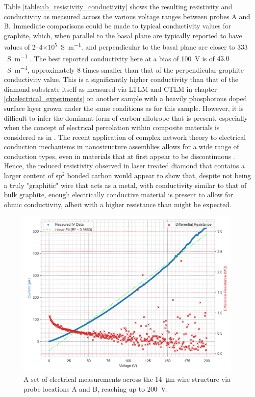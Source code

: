 \begin{refsection}
Table \ref{table:ab_resistivity_conductivity} shows the resulting resistivity and conductivity as measured across the various voltage ranges between probes A and B. Immediate comparisons could be made to typical conductivity values for graphite, which, when parallel to the basal plane are typically reported to have values of 2--4$\times10^{5}$~\si{\siemens\per\metre}, and perpendicular to the basal plane are closer to $333$~\si{\siemens\per\metre} \cite{pierson1993}. The best reported conductivity here at a bias of 100~\si{\volt} is of $43.0$~\si{\siemens\per\metre}, approximately 8 times smaller than that of the perpendicular graphite conductivity value. This is a significantly higher conductivity than that of the diamond substrate itself as measured via LTLM and CTLM in chapter \ref{ch:electrical_experiments} on another sample with a heavily phosphorous doped surface layer grown under the same conditions as for this sample. However, it is difficult to infer the dominant form of carbon allotrope that is present, especially when the concept of electrical percolation within composite materials is considered as in \cite{mclachlan1990}. The recent application of complex network theory to electrical conduction mechanisms in nanostructure assemblies allows for a wide range of conduction types, even in materials that at first appear to be discontinuous \cite{yao2020}. Hence, the reduced resistivity observed in laser treated diamond that contains a larger content of sp$^{2}$ bonded carbon would appear to show that, despite not being a truly "graphitic" wire that acts as a metal, with conductivity similar to that of bulk graphite, enough electrically conductive material is present to allow for ohmic conductivity, albeit with a higher resistance than might be expected.

\begin{figure}[H]
    \centering
    \includegraphics[width=\linewidth]{Chapter7/Figs/Raster/200V AB d.png}
    \caption{A set of electrical measurements across the 14~\si{\micro\metre} wire structure via probe locations A and B, reaching up to 200~\si{\volt}.}
    \label{fig:200v_ab}
\end{figure}


\end{refsection}
